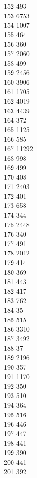 { 152	493 \\
 153	6753 \\
 154	1007 \\
 155	464 \\
 156	360 \\
 157	2060 \\
 158	499 \\
 159	2456 \\
 160	3906 \\
 161	1705 \\
 162	4019 \\
 163	4439 \\
 164	372 \\
 165	1125 \\
 166	585 \\
 167	11292 \\
 168	998 \\
 169	499 \\
 170	408 \\
 171	2403 \\
 172	401 \\
 173	658 \\
 174	344 \\
 175	2448 \\
 176	340 \\
 177	491 \\
 178	2012 \\
 179	414 \\
 180	369 \\
 181	443 \\
 182	417 \\
 183	762 \\
 184	35 \\
 185	515 \\
 186	3310 \\
 187	3492 \\
 188	37 \\
 189	2196 \\
 190	357 \\
 191	1170 \\
 192	350 \\
 193	510 \\
 194	364 \\
 195	516 \\
 196	446 \\
 197	447 \\
 198	441 \\
 199	390 \\
 200	441 \\
 201	392 \\
}
